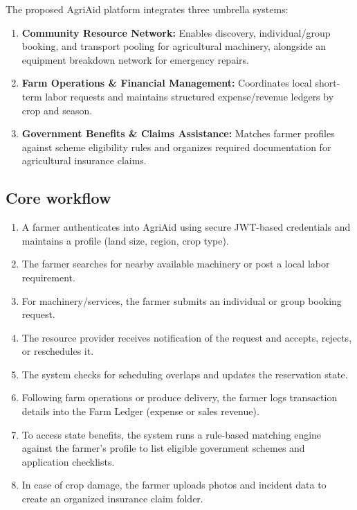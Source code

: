 \documentclass[11pt,a4paper]{article}
\begin{document}
The proposed AgriAid platform integrates three umbrella systems:
\begin{enumerate}[leftmargin=*]
    \item \textbf{Community Resource Network:} Enables discovery, individual/group booking, and transport pooling for agricultural machinery, alongside an equipment breakdown network for emergency repairs.
    \item \textbf{Farm Operations \& Financial Management:} Coordinates local short-term labor requests and maintains structured expense/revenue ledgers by crop and season.
    \item \textbf{Government Benefits \& Claims Assistance:} Matches farmer profiles against scheme eligibility rules and organizes required documentation for agricultural insurance claims.
\end{enumerate}

\subsection{Core workflow}
\begin{enumerate}[leftmargin=*]
    \item A farmer authenticates into AgriAid using secure JWT-based credentials and maintains a profile (land size, region, crop type).
    \item The farmer searches for nearby available machinery or post a local labor requirement.
    \item For machinery/services, the farmer submits an individual or group booking request.
    \item The resource provider receives notification of the request and accepts, rejects, or reschedules it.
    \item The system checks for scheduling overlaps and updates the reservation state.
    \item Following farm operations or produce delivery, the farmer logs transaction details into the Farm Ledger (expense or sales revenue).
    \item To access state benefits, the system runs a rule-based matching engine against the farmer's profile to list eligible government schemes and application checklists.
    \item In case of crop damage, the farmer uploads photos and incident data to create an organized insurance claim folder.
\end{enumerate}
\end{document}
